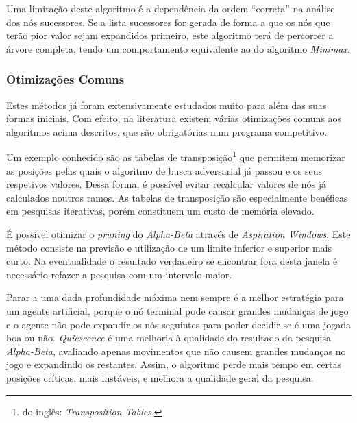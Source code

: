 \documentclass[12pt,a4paper,oneside]{article}
\begin{document}
Uma limitação deste algoritmo é a dependência da ordem ``correta'' na
análise dos nós sucessores. Se a lista sucessores for gerada de forma
a que os nós que terão pior valor sejam expandidos primeiro, este
algoritmo terá de percorrer a árvore completa, tendo um comportamento
equivalente ao do algoritmo \textit{Minimax}.

\subsubsection{Otimizações Comuns}\label{ab:opt}

Estes métodos já foram extensivamente estudados muito para além das
suas formas iniciais. Com efeito, na literatura existem várias
otimizações comuns aos algoritmos acima descritos, que são
obrigatórias num programa competitivo.

Um exemplo conhecido são as tabelas de transposição\footnote{do
  inglês: \emph{Transposition Tables}.} que permitem memorizar as
posições pelas quais o algoritmo de busca adversarial já passou e os
seus respetivos valores. Dessa forma, é possível evitar recalcular
valores de nós já calculados noutros ramos. As tabelas de transposição
são especialmente benéficas em pesquisas iterativas, porém constituem
um custo de memória elevado.

É possível otimizar o \emph{pruning} do \emph{Alpha-Beta} através de
\emph{Aspiration Windows}. Este método consiste na previsão e
utilização de um limite inferior e superior mais curto. Na
eventualidade o resultado verdadeiro se encontrar fora desta janela é
necessário refazer a pesquisa com um intervalo maior.

Parar a uma dada profundidade máxima nem sempre é a melhor estratégia
para um agente artificial, porque o nó terminal pode causar grandes
mudanças de jogo e o agente não pode expandir os nós seguintes para
poder decidir se é uma jogada boa ou não. \emph{Quiescence} é uma
melhoria à qualidade do resultado da pesquisa \emph{Alpha-Beta},
avaliando apenas movimentos que não causem grandes mudanças no jogo e
expandindo os restantes. Assim, o algoritmo perde mais tempo em certas
posições críticas, mais instáveis, e melhora a qualidade geral da
pesquisa.


\end{document}
